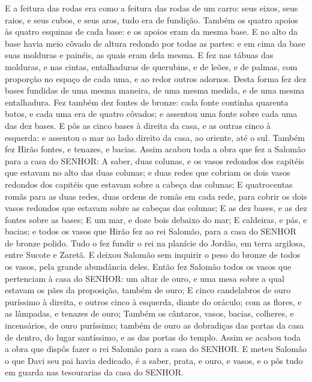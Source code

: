 {  E a feitura das rodas era como a feitura das rodas de um carro: seus eixos, seus raios, e seus cubos, e seus aros, tudo era de fundição.
  Também os quatro apoios às quatro esquinas de cada base: e os apoios eram da mesma base.
  E no alto da base havia meio côvado de altura redondo por todas as partes: e em cima da base suas molduras e painéis, as quais eram dela mesma. %
  E fez nas tábuas das molduras, e nas cintas, entalhaduras de querubins, e de leões, e de palmas, com proporção no espaço de cada uma, e ao redor outros adornos.
  Desta forma fez dez bases fundidas de uma mesma maneira, de uma mesma medida, e de uma mesma entalhadura. %
  Fez também dez fontes de bronze: cada fonte continha quarenta batos, e cada uma era de quatro côvados; e assentou uma fonte sobre cada uma das dez bases.
  E pôs as cinco bases à direita da casa, e as outras cinco à esquerda: e assentou o mar ao lado direito da casa, ao oriente, até o sul.
  Também fez Hirão fontes, e tenazes, e bacias. Assim acabou toda a obra que fez a Salomão para a casa do SENHOR:
  A saber, duas colunas, e os vasos redondos dos capitéis que estavam no alto das duas colunas; e duas redes que cobriam os dois vasos redondos dos capitéis que estavam sobre a cabeça das colunas;
  E quatrocentas romãs para as duas redes, duas ordens de romãs em cada rede, para cobrir os dois vasos redondos que estavam sobre as cabeças das colunas;
  E as dez bases, e as dez fontes sobre as bases;
  E um mar, e doze bois debaixo do mar;
  E caldeiras, e pás, e bacias; e todos os vasos que Hirão fez ao rei Salomão, para a casa do SENHOR de bronze polido.
  Tudo o fez fundir o rei na planície do Jordão, em terra argilosa, entre Sucote e Zaretã. %
  E deixou Salomão sem inquirir o peso do bronze de todos os vasos, pela grande abundância deles.
  Então fez Salomão todos os vasos que pertenciam à casa do SENHOR: um altar de ouro, e uma mesa sobre a qual estavam os pães da proposição, também de ouro;
  E cinco candelabros de ouro puríssimo à direita, e outros cinco à esquerda, diante do oráculo; com as flores, e as lâmpadas, e tenazes de ouro;
  Também os cântaros, vasos, bacias, colheres, e incensários, de ouro puríssimo; também de ouro as dobradiças das portas da casa de dentro, do lugar santíssimo, e as das portas do templo. %
  Assim se acabou toda a obra que dispôs fazer o rei Salomão para a casa do SENHOR. E meteu Salomão o que Davi seu pai havia dedicado, é a saber, prata, e ouro, e vasos, e o pôs tudo em guarda nas tesourarias da casa do SENHOR.
\par }

